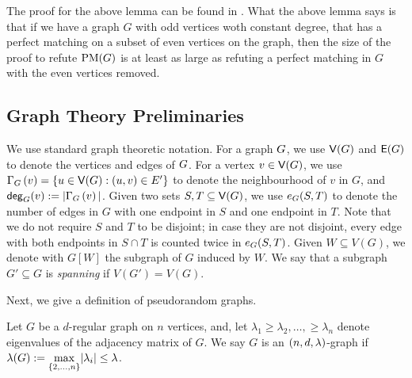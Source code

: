 \documentclass[11pt]{article}
\begin{document}
The proof for the above lemma can be found in \citep[Lemma 2.2]{Austrin_2022}.
What the above lemma says is that if we have a graph $G$ with odd vertices woth constant degree, that has a perfect matching on a subset of even vertices on the graph, then the size of the proof to refute $\PM{G}$ is at least as large as refuting a perfect matching in $G$ with the even vertices removed.


\subsection{Graph Theory Preliminaries}
\label{sec:graph-theory-prelims}

We use standard graph theoretic notation. For a graph $\Graph$, we use $\Vertices{\Graph}$ and $\Edges{\Graph}$ to denote the vertices and edges of $\Graph$. For a vertex $v \in \Vertices{\Graph}$, we use $\Neighbourhood{G}{v} = \{ u \in \Vertices{\Graph} : (u,v) \in E' \}$ to denote the neighbourhood of $v$ in $G$, and $\degree{G}{v} := |\Neighbourhood{G}{v}|$. Given two sets $S, T \subseteq \Vertices{G}$, we  use $\CutEdges{S}{T}{G}$ to denote the number of edges in $G$ with one endpoint in $S$ and one endpoint in $T$.  Note that we do not require $S$ and $T$ to be disjoint; in case they are not disjoint, every edge with both endpoints in $S \cap T$ is counted twice in $\CutEdges{S}{T}{G}$. Given $W \subseteq V(G)$, we denote with $G[W]$ the subgraph of $G$ induced by $W$. We say that a subgraph $G' \subseteq G$ is \emph{spanning} if $V(G') = V(G)$.



Next, we give a definition of pseudorandom graphs.

\begin{definition}\label{def:expander-graphs}
Let $G$ be a $d$-regular graph on $n$ vertices, and, let $\lambda_1 \geq \lambda_2, \dots, \geq \lambda_n$ denote eigenvalues of the adjacency matrix of $G$.
We say $G$ is an $\EnDeeLambda$-graph if $\ExpansionFactor{\Graph} := \underset{{\{2, \dots, n\}}}{\max}|\lambda_i| \leq \lambda$.
\end{definition}
\end{document}
